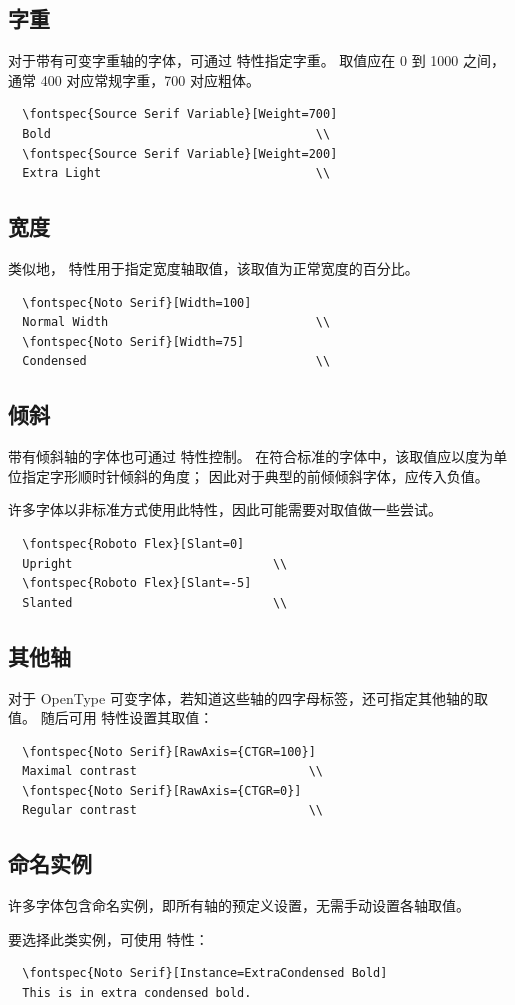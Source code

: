 \documentclass[a4paper]{l3doc}
\begin{document}
\subsection{字重} \label{sec:variable-weight}
对于带有可变字重轴的字体，可通过  特性指定字重。
取值应在 0 到 1000 之间，通常 400 对应常规字重，700 对应粗体。
\begin{Verbatim}
  \fontspec{Source Serif Variable}[Weight=700]
  Bold                                     \\
  \fontspec{Source Serif Variable}[Weight=200]
  Extra Light                              \\
\end{Verbatim}


\subsection{宽度} \label{sec:variable-width}
类似地， 特性用于指定宽度轴取值，该取值为正常宽度的百分比。
\begin{Verbatim}
  \fontspec{Noto Serif}[Width=100]
  Normal Width                             \\
  \fontspec{Noto Serif}[Width=75]
  Condensed                                \\
\end{Verbatim}

\subsection{倾斜} \label{sec:variable-slant}
带有倾斜轴的字体也可通过  特性控制。
在符合标准的字体中，该取值应以度为单位指定字形顺时针倾斜的角度；
因此对于典型的前倾倾斜字体，应传入负值。

许多字体以非标准方式使用此特性，因此可能需要对取值做一些尝试。
\begin{Verbatim}
  \fontspec{Roboto Flex}[Slant=0]
  Upright                            \\
  \fontspec{Roboto Flex}[Slant=-5]
  Slanted                            \\
\end{Verbatim}

\subsection{其他轴} \label{sec:variable-raw}
对于 OpenType 可变字体，若知道这些轴的四字母标签，还可指定其他轴的取值。
随后可用  特性设置其取值：
\begin{Verbatim}
  \fontspec{Noto Serif}[RawAxis={CTGR=100}]
  Maximal contrast                        \\
  \fontspec{Noto Serif}[RawAxis={CTGR=0}]
  Regular contrast                        \\
\end{Verbatim}

\subsection{命名实例} \label{sec:variable-instances}
许多字体包含命名实例，即所有轴的预定义设置，无需手动设置各轴取值。

要选择此类实例，可使用  特性：
\begin{Verbatim}
  \fontspec{Noto Serif}[Instance=ExtraCondensed Bold]
  This is in extra condensed bold.
\end{Verbatim}
\end{document}
